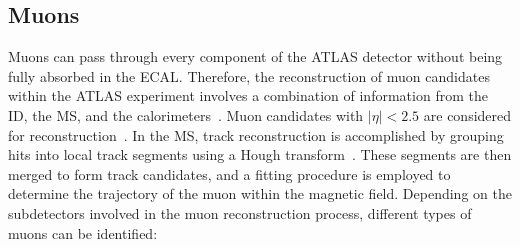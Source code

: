 \subsection{Muons}
\label{sec:Chap3:Reco:Mu}
Muons can pass through every component of the ATLAS detector without being fully absorbed 
in the ECAL.
Therefore, the reconstruction of muon candidates within the ATLAS experiment involves a combination of 
information from the ID, the MS, and the calorimeters~\cite{ATLAS:2016lqx}. Muon candidates with $|\eta|<2.5$ are 
considered for reconstruction~\cite{ATLAS:2020auj}. 
In the MS, track reconstruction is accomplished 
by grouping hits into local track segments using a Hough transform~\cite{ILLINGWORTH198887}.
These segments are then merged to form track candidates, and a fitting procedure is employed to 
determine the trajectory of the muon within the magnetic field. Depending on the subdetectors 
involved in the muon reconstruction process, different types of muons can be identified:
